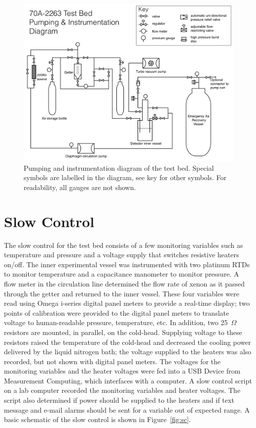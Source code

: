 \begin{figure}[htbp]
\begin{center}
\includegraphics[width=\textwidth]{figures/testbed/full_pid.png}
\caption{Pumping and instrumentation diagram of the test bed. Special symbols are labelled in the diagram, see key for other symbols. For readability, all gauges are not shown.}
\label{fig:circ}
\end{center}
\end{figure}


\section{Slow Control}
The slow control for the test bed consists of a few monitoring variables such as temperature and pressure and a voltage supply that switches resistive heaters on/off. The inner experimental vessel was instrumented with two platinum \ac{RTD}s to monitor temperature and a capacitance manometer to monitor pressure. A flow meter in the circulation line determined the flow rate of xenon as it passed through the getter and returned to the inner vessel. These four variables were read using Omega i-series digital panel meters to provide a real-time display; two points of calibration were provided to the digital panel meters to translate voltage to human-readable pressure, temperature, etc. In addition, two 25~$\Omega$ resistors are mounted, in parallel, on the cold-head. Supplying voltage to these resistors raised the temperature of the cold-head and decreased the cooling power delivered by the liquid nitrogen bath; the voltage supplied to the heaters was also recorded, but not shown with digital panel meters. The voltages for the monitoring variables and the heater voltages were fed into a USB Device from Measurement Computing, which interfaces with a computer. A slow control script on a lab computer recorded the monitoring variables and heater voltages. The script also determined if power should be supplied to the heaters and if text message and e-mail alarms should be sent for a variable out of expected range. A basic schematic of the slow control is shown in Figure~\ref{fig:sc}.

